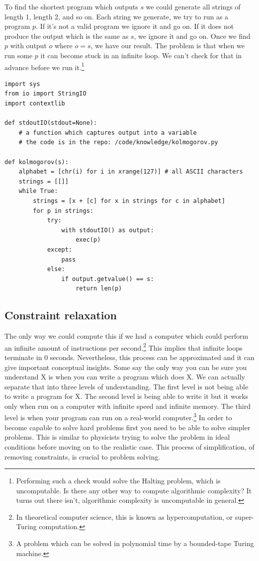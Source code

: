 To find the shortest program which outputs $s$ we could generate all strings of length 1, length 2, and so on.
Each string we generate, we try to run as a program $p$.
If it's not a valid program we ignore it and go on.
If it does not produce the output which is the same as $s$, we ignore it and go on.
Once we find $p$ with output $o$ where $o = s$, we have our result.
The problem is that when we run some $p$ it can become stuck in an infinite loop.
We can't check for that in advance before we run it.\footnote{
Performing such a check would solve the Halting problem, which is uncomputable.
Is there any other way to compute algorithmic complexity?
It turns out there isn't, algorithmic complexity is uncomputable in general.
}

\newpage

\begin{lstlisting}[caption={Computing the algorithmic complexity of a string. Do not run this at home.}]
import sys
from io import StringIO
import contextlib

def stdoutIO(stdout=None):
	# a function which captures output into a variable
	# the code is in the repo: /code/knowledge/kolmogorov.py

def kolmogorov(s):
	alphabet = [chr(i) for i in xrange(127)] # all ASCII characters
	strings = [[]]
	while True:
		strings = [x + [c] for x in strings for c in alphabet]
		for p in strings:
			try:
				with stdoutIO() as output:
					exec(p)
			except:
				pass
			else:
				if output.getvalue() == s:
					return len(p)
\end{lstlisting}

\newpage

\subsection{Constraint relaxation}

The only way we could compute this if we had a computer which could perform an infinite amount of instructions per second.\footnote{In theoretical computer science, this is known as hypercomputation, or super-Turing computation.}
This implies that infinite loops terminate in 0 seconds.
Nevertheless, this process can be approximated and it can give important conceptual insights.
Some say the only way you can be sure you understand X is when you can write a program which does X.
We can actually separate that into three levels of understanding.
The first level is not being able to write a program for X.
The second level is being able to write it but it works only when run on a computer with infinite speed and infinite memory.
The third level is when your program can run on a real-world computer.\footnote{A problem which can be solved in polynomial time by a bounded-tape Turing machine.}
In order to become capable to solve hard problems first you need to be able to solve simpler problems.
This is similar to physicists trying to solve the problem in ideal conditions before moving on to the realistic case.
This process of simplification, of removing constraints, is crucial to problem solving.

